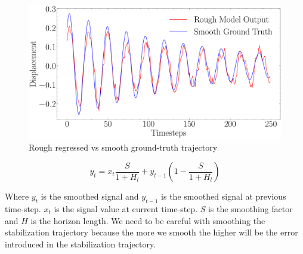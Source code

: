 \begin{figure}[H]
    \centering
    \includegraphics[scale=0.41]{images/fig_chapter4/nn_related/rough_mo_smooth_gt.pdf}
    \caption{Rough regressed vs smooth ground-truth trajectory}
    \label{fig:rough_mo_smooth_gt}
\end{figure}

\begin{equation}
    y_t = x_t  \frac{S}{1+H_l} + y_{t-1}(1 - \frac{S}{1+H_l})
    \label{eqn:emaf}
\end{equation}

Where $ y_t $ is the smoothed signal and $ y_{t-1} $ is the smoothed signal at previous time-step. $ x_t $ is the signal value at current time-step. $ S $ is the smoothing factor and $ H $ is the horizon length. We need to be careful with smoothing the stabilization trajectory because the more we smooth the higher will be the error introduced in the stabilization trajectory.



